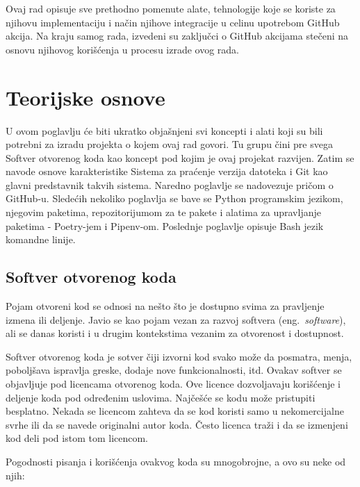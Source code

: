 \documentclass[12pt]{report}
\begin{document}
Ovaj rad opisuje sve prethodno pomenute alate, tehnologije koje se koriste za njihovu implementaciju i način njihove integracije u celinu upotrebom GitHub akcija. Na kraju samog rada, izvedeni su zaključci o GitHub akcijama stečeni na osnovu njihovog korišćenja u procesu izrade ovog rada.

\chapter{Teorijske osnove}
U ovom poglavlju će biti ukratko objašnjeni svi koncepti i alati koji su bili potrebni za izradu projekta o kojem ovaj rad govori. Tu grupu čini pre svega Softver otvorenog koda kao koncept pod kojim je ovaj projekat razvijen. Zatim se navode osnove karakteristike Sistema za praćenje verzija datoteka i Git kao glavni predstavnik takvih sistema. Naredno poglavlje se nadovezuje pričom o GitHub-u. Sledećih nekoliko poglavlja se bave se Python programskim jezikom, njegovim paketima, repozitorijumom za te pakete i alatima za upravljanje paketima - Poetry-jem i Pipenv-om. Poslednje poglavlje opisuje Bash jezik komandne linije.

\section{Softver otvorenog koda}
Pojam otvoreni kod se odnosi na nešto što je dostupno svima za pravljenje izmena ili deljenje. Javio se kao pojam vezan za razvoj softvera (eng.\ \textit{software}), ali se danas koristi i u drugim kontekstima vezanim za otvorenost i dostupnost.

Softver otvorenog koda je sotver čiji izvorni kod svako može da posmatra, menja, poboljšava ispravlja greske, dodaje nove funkcionalnosti, itd. Ovakav softver se objavljuje pod licencama otvorenog koda. Ove licence dozvoljavaju korišćenje i deljenje koda pod određenim uslovima. Najčešće se kodu može pristupiti besplatno. Nekada se licencom zahteva da se kod koristi samo u nekomercijalne svrhe ili da se navede originalni autor koda. Često licenca traži i da se izmenjeni kod deli pod istom tom licencom.

Pogodnosti pisanja i korišćenja ovakvog koda su mnogobrojne, a ovo su neke od njih:
\end{document}
